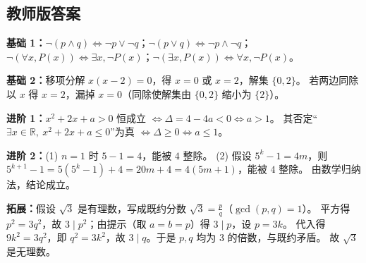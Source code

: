 \begin{afterclass}
\subsection*{教师版答案}
\begin{solution}
\textbf{基础 1：}$\neg(p\land q)\iff\neg p\lor\neg q$；$\neg(p\lor q)\iff\neg p\land\neg q$；
$\neg(\forall x,P(x))\iff\exists x,\neg P(x)$；$\neg(\exists x,P(x))\iff\forall x,\neg P(x)$。
\end{solution}
\begin{solution}
\textbf{基础 2：}移项分解 $x(x-2)=0$，得 $x=0$ 或 $x=2$，解集 $\{0,2\}$。
若两边同除以 $x$ 得 $x=2$，漏掉 $x=0$（同除使解集由 $\{0,2\}$ 缩小为 $\{2\}$）。
\end{solution}
\begin{solution}
\textbf{进阶 1：}$x^2+2x+a>0$ 恒成立 $\iff\Delta=4-4a<0\iff a>1$。
其否定“$\exists x\in\mathbb{R},\ x^2+2x+a\leq0$”为真 $\iff\Delta\geq0\iff a\leq1$。
\end{solution}
\begin{solution}
\textbf{进阶 2：}(1) $n=1$ 时 $5-1=4$，能被 $4$ 整除。
(2) 假设 $5^k-1=4m$，则 $5^{k+1}-1=5(5^k-1)+4=20m+4=4(5m+1)$，能被 $4$ 整除。
由数学归纳法，结论成立。
\end{solution}
\begin{solution}
\textbf{拓展：}假设 $\sqrt3$ 是有理数，写成既约分数 $\sqrt3=\frac pq$（$\gcd(p,q)=1$）。
平方得 $p^2=3q^2$，故 $3\mid p^2$；由提示（取 $a=b=p$）得 $3\mid p$，设 $p=3k$。
代入得 $9k^2=3q^2$，即 $q^2=3k^2$，故 $3\mid q$。于是 $p,q$ 均为 $3$ 的倍数，与既约矛盾。
故 $\sqrt3$ 是无理数。
\end{solution}
\end{afterclass}
